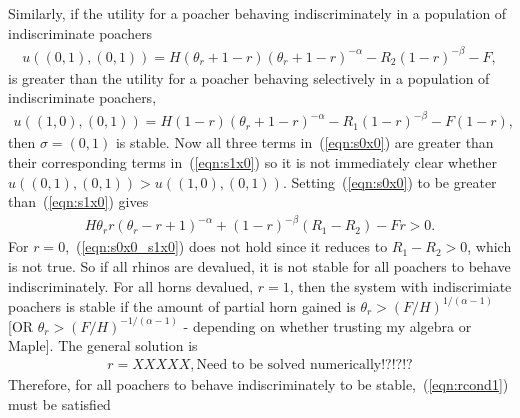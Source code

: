 \documentclass[10pt]{article}
\begin{document}
Similarly, if the utility for a poacher behaving indiscriminately in a population of indiscriminate poachers
\begin{eqnarray}
\label{eqn:s0x0}
 u((0,1),(0,1)) = H(\theta_r + 1 - r)(\theta_r + 1 - r)^{-\alpha} - R_2(1-r)^{-\beta} - F,
\end{eqnarray}
is greater than the utility for a poacher behaving selectively in a population of indiscriminate poachers,
\begin{eqnarray}
\label{eqn:s1x0}
u((1,0),(0,1)) = H(1 -r)(\theta_r + 1 - r)^{-\alpha} - R_1(1-r)^{-\beta} - F(1-r),
\end{eqnarray}
then $\sigma = (0,1)$ is stable. Now all three terms in~(\ref{eqn:s0x0}) are greater than their corresponding terms in~(\ref{eqn:s1x0}) so it is not immediately clear whether $u((0,1),(0,1)) > u((1,0),(0,1))$. Setting~(\ref{eqn:s0x0}) to be greater than~(\ref{eqn:s1x0}) gives
\begin{eqnarray}
\label{eqn:s0x0_s1x0}
H\theta_r r (\theta_r - r + 1)^{-\alpha} + (1-r)^{-\beta}(R_1-R_2) - Fr > 0.
\end{eqnarray}
For $r = 0$,~(\ref{eqn:s0x0_s1x0}) does not hold since it reduces to $R_1-R_2 > 0$, which is not true. So if all rhinos are devalued, it is not stable for all poachers to behave indiscriminately. For all horns devalued, $r=1$, then the system with indiscrimiate poachers is stable if the amount of partial horn gained is $\theta_r > (F/H)^{1/(\alpha-1)}$ [OR $\theta_r > (F/H)^{-1/(\alpha-1)}$ - depending on whether trusting my algebra or Maple]. The general solution is
\begin{eqnarray}
\label{eqn:rcond1}
r = XXXXX,\mbox{Need to be solved numerically!?!?!?}
\end{eqnarray}
Therefore, for all poachers to behave indiscriminately to be stable,~(\ref{eqn:rcond1}) must be satisfied
\end{document}
